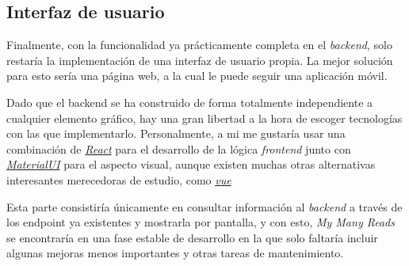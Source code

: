 \subsection{Interfaz de usuario}

Finalmente, con la funcionalidad ya prácticamente completa en el \textit{backend}, solo restaría la implementación de una interfaz de usuario propia. La mejor solución para esto sería una página web, a la cual le puede seguir una aplicación móvil.

Dado que el backend se ha construido de forma totalmente independiente a cualquier elemento gráfico, hay una gran libertad a la hora de escoger tecnologías con las que implementarlo. Personalmente, a mi me gustaría usar una combinación de \href{https://es.react.dev/}{\textit{React}} para el desarrollo de la lógica \textit{frontend} junto con \href{https://mui.com/}{\textit{MaterialUI}} para el aspecto visual, aunque existen muchas otras alternativas interesantes merecedoras de estudio, como \href{https://vuejs.org/}{\textit{vue}}

Esta parte consistiría únicamente en consultar información al \textit{backend} a través de los endpoint ya existentes y mostrarla por pantalla, y con esto, \textit{My Many Reads} se encontraría en una fase estable de desarrollo en la que solo faltaría incluir algunas mejoras menos importantes y otras tareas de mantenimiento.